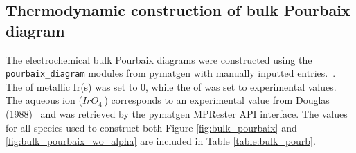 

\begin{table}
\centering
\caption{\label{table:amorph_limit}
%
Density functional theory computed energetics of sampled amorphous phases for \IrOtwo and \IrOthree as per the procedure of Aykol ~\cite{Aykol2018}.
%
Here we report the raw DFT electronic energy per atom ($E_{DFT}$),
the enthalpy of formation (\DHf),
and the energy above the hull relative to the most stable polymorph of each stoichiometry (\rIrOtwo and \aIrOthree).
%
The most stable amorphous phase for each stoichiometry is bolded.
}

\end{table}








\subsection{Thermodynamic construction of bulk Pourbaix diagram}
%
%
The electrochemical bulk Pourbaix diagrams were constructed using the \texttt{pourbaix\_diagram} modules from pymatgen with manually inputted entries.~\cite{Ong2013}.
%
The \DGf of metallic Ir(s) was set to 0, while the \DGf of \rIrOtwo was set to experimental values.~\cite{Barin1995}
%
The aqueous ion ($IrO_{4}^{-}$) corresponds to an experimental value from Douglas (1988)~\cite{Adams1988} and was retrieved by the pymatgen MPRester API interface.
%
The \DGf values for all species used to construct both Figure \ref{fig:bulk_pourbaix} and \ref{fig:bulk_pourbaix_wo_alpha} are included in Table \ref{table:bulk_pourb}.

